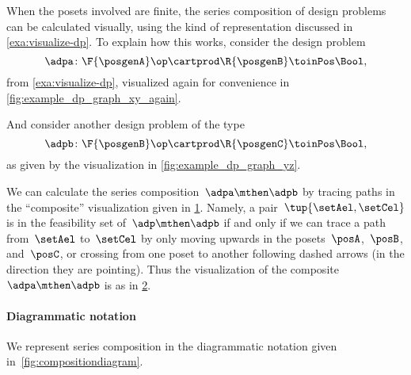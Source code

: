 When the posets involved are finite, the series composition of design problems can be calculated visually, using the kind of representation discussed in \cref{exa:visualize-dp}.
To explain how this works, consider the design problem
\begin{equation*}
    \adpa \colon \F{\posgenA} \op \cartprod  \R{\posgenB} \toinPos \Bool,
\end{equation*}
from \cref{exa:visualize-dp}, visualized again for convenience in \cref{fig:example_dp_graph_xy_again}.
\begin{marginfigure}
    \centering
    \caption{ }
    \label{fig:example_dp_graph_xy_again}
\end{marginfigure}
And consider another design problem of the type
\begin{equation*}
    \adpb \colon \F{\posgenB} \op \cartprod  \R{\posgenC} \toinPos \Bool,
\end{equation*}
as given by the visualization in \cref{fig:example_dp_graph_yz}.
\begin{marginfigure}
    \centering
    \caption{ }
    \label{fig:example_dp_graph_yz}
\end{marginfigure}
We can calculate the series composition~$\adpa \mthen \adpb$ by tracing paths in the ``composite'' visualization given in \cref{fig:example_dp_graph_xyz}.
Namely, a pair~$\tup{\setAel, \setCel}$ is in the feasibility set of~$\adp \mthen \adpb$ if and only if we can trace a path from~$\setAel$ to~$\setCel$ by only moving upwards in the posets~$\posA$,~$\posB$, and~$\posC$, or crossing from one poset to another following dashed arrows (in the direction they are pointing).
Thus the visualization of the composite~$\adpa \mthen \adpb$ is as in \cref{fig:example_dp_graph_xz}.
\begin{figure}[h!]
    \centering
    \caption{}
    \label{fig:example_dp_graph_xyz}
\end{figure}
\begin{figure}[h!]
    \centering
    \caption{}
    \label{fig:example_dp_graph_xz}
\end{figure}



\paragraph{Diagrammatic notation}
We represent series composition in the diagrammatic notation given in~\cref{fig:compositiondiagram}.

